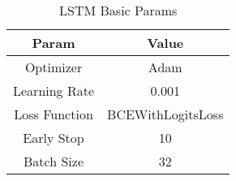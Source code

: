 

\begin{table}[b!]  
\caption{\centering LSTM Basic Params}%
    \centering
    \begin{tabular}{c c}            %
        \toprule 
        Param & Value \\
        \midrule
        Optimizer & Adam \\
        Learning Rate & 0.001 \\
        Loss Function & BCEWithLogitsLoss \\
        Early Stop & 10 \\
        Batch Size & 32 \\
        \bottomrule
    \end{tabular}
    \vspace{10pt}
    \vspace{-5pt}
    \label{tab:lstm1}
\end{table}
